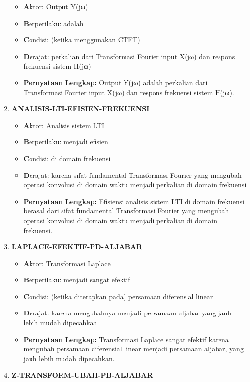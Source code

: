 \documentclass[
  letterpaper,
  DIV=11,
  numbers=noendperiod]{scrreprt}
\begin{document}
\begin{enumerate}
  \begin{itemize}
  \item
    \textbf{A}ktor: Output Y(jω)
  \item
    \textbf{B}erperilaku: adalah
  \item
    \textbf{C}ondisi: (ketika menggunakan CTFT)
  \item
    \textbf{D}erajat: perkalian dari Transformasi Fourier input X(jω)
    dan respons frekuensi sistem H(jω)
  \item
    \textbf{Pernyataan Lengkap:} Output Y(jω) adalah perkalian dari
    Transformasi Fourier input X(jω) dan respons frekuensi sistem H(jω).
  \end{itemize}
\item
  \textbf{ANALISIS-LTI-EFISIEN-FREKUENSI}

  \begin{itemize}
  \item
    \textbf{A}ktor: Analisis sistem LTI
  \item
    \textbf{B}erperilaku: menjadi efisien
  \item
    \textbf{C}ondisi: di domain frekuensi
  \item
    \textbf{D}erajat: karena sifat fundamental Transformasi Fourier yang
    mengubah operasi konvolusi di domain waktu menjadi perkalian di
    domain frekuensi
  \item
    \textbf{Pernyataan Lengkap:} Efisiensi analisis sistem LTI di domain
    frekuensi berasal dari sifat fundamental Transformasi Fourier yang
    mengubah operasi konvolusi di domain waktu menjadi perkalian di
    domain frekuensi.
  \end{itemize}
\item
  \textbf{LAPLACE-EFEKTIF-PD-ALJABAR}

  \begin{itemize}
  \item
    \textbf{A}ktor: Transformasi Laplace
  \item
    \textbf{B}erperilaku: menjadi sangat efektif
  \item
    \textbf{C}ondisi: (ketika diterapkan pada) persamaan diferensial
    linear
  \item
    \textbf{D}erajat: karena mengubahnya menjadi persamaan aljabar yang
    jauh lebih mudah dipecahkan
  \item
    \textbf{Pernyataan Lengkap:} Transformasi Laplace sangat efektif
    karena mengubah persamaan diferensial linear menjadi persamaan
    aljabar, yang jauh lebih mudah dipecahkan.
  \end{itemize}
\item
  \textbf{Z-TRANSFORM-UBAH-PB-ALJABAR}


\end{enumerate}
\end{document}
